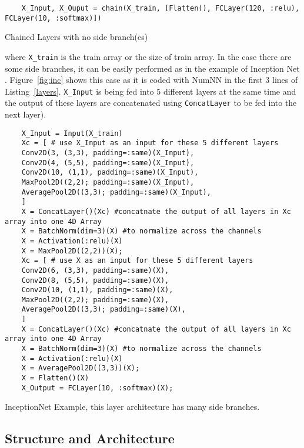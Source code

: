 \begin{listing}[H]
	\begin{verbatim}
	X_Input, X_Ouput = chain(X_train, [Flatten(), FCLayer(120, :relu), FCLayer(10, :softmax)])
	\end{verbatim}
	\caption{Chained Layers with no side branch(es)}\label{chain}
\end{listing}


where \texttt{X_train} is the train array or the size of train array. In the case there are some side branches, it can be easily performed as in the example of Inception Net \cite{Szegedy2016}. Figure~\ref{fig:inc} shows this case as it is coded with NumNN in the first 3 lines of Listing~\ref{layers}. \texttt{X_Input} is being fed into 5 different layers at the same time and the output of these layers are concatenated using \texttt{ConcatLayer} to be fed into the next layer). 

\begin{listing}[!h]
	\begin{verbatim}
	X_Input = Input(X_train)
	Xc = [ # use X_Input as an input for these 5 different layers
	Conv2D(3, (3,3), padding=:same)(X_Input),
	Conv2D(4, (5,5), padding=:same)(X_Input),
	Conv2D(10, (1,1), padding=:same)(X_Input),
	MaxPool2D((2,2); padding=:same)(X_Input),
	AveragePool2D((3,3); padding=:same)(X_Input),
	]
	X = ConcatLayer()(Xc) #concatnate the output of all layers in Xc array into one 4D Array
	X = BatchNorm(dim=3)(X) #to normalize across the channels
	X = Activation(:relu)(X)
	X = MaxPool2D((2,2))(X);
	Xc = [ # use X as an input for these 5 different layers
	Conv2D(6, (3,3), padding=:same)(X),
	Conv2D(8, (5,5), padding=:same)(X),
	Conv2D(10, (1,1), padding=:same)(X),
	MaxPool2D((2,2); padding=:same)(X),
	AveragePool2D((3,3); padding=:same)(X),
	]
	X = ConcatLayer()(Xc) #concatnate the output of all layers in Xc array into one 4D Array
	X = BatchNorm(dim=3)(X) #to normalize across the channels
	X = Activation(:relu)(X)
	X = AveragePool2D((3,3))(X);
	X = Flatten()(X)
	X_Output = FCLayer(10, :softmax)(X);
	\end{verbatim}
	\caption{InceptionNet Example, this layer architecture has many side branches.}\label{layers}
\end{listing}


\subsection{Structure and Architecture}\label{subsec:saa}

